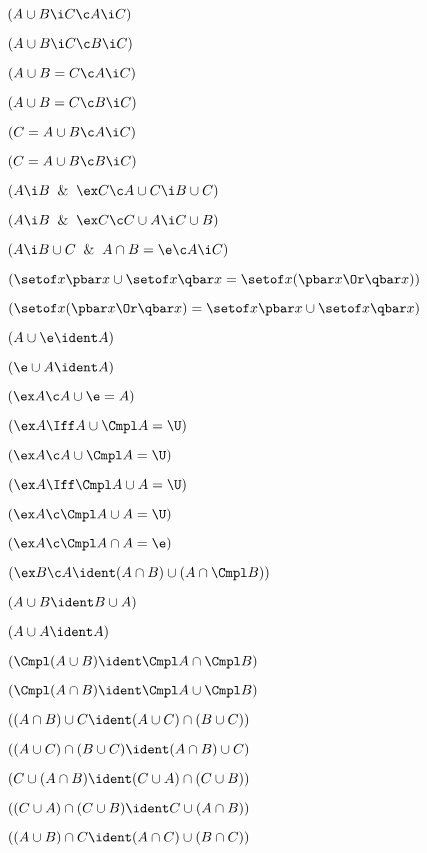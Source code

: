  $(A \cup B \i C \c A \i C)$

 $(A \cup B \i C \c B \i C)$

 $(A \cup B = C \c A \i C)$

 $(A \cup B = C \c B \i C)$

 $(C = A \cup B \c A \i C)$

 $(C = A \cup B \c B \i C)$

 $(A\i B \And \ex C\c A\cup C \i B\cup C)$

 $(A\i B \And \ex C\c C \cup A \i C \cup  B)$

 $(A\i B \cup C \And A \cap B = \e \c A \i C)$

 $(\setof x \pbar x \cup \setof x \qbar x = \setof x (\pbar x\Or \qbar x))$

 $( \setof x (\pbar x\Or\qbar x) = \setof x \pbar x \cup \setof x \qbar x)$

 $(A \cup \e \ident A)$

 $(\e \cup A \ident A)$

 $(\ex A \c A\cup \e = A)$

 $(\ex A \Iff A \cup \Cmpl A = \U)$

 $(\ex A \c A \cup \Cmpl A = \U)$

 $(\ex A \Iff \Cmpl A \cup A = \U)$

 $(\ex A \c \Cmpl A \cup  A = \U)$

 $(\ex A \c \Cmpl A \cap  A = \e)$

 $(\ex B \c A \ident(A\cap B)\cup(A \cap \Cmpl B))$

 $(A \cup B \ident B \cup A)$

 $(A \cup A \ident A)$

 $(\Cmpl(A \cup B) \ident \Cmpl A \cap \Cmpl B)$

 $(\Cmpl(A \cap B) \ident \Cmpl A \cup \Cmpl B)$

 $((A \cap B) \cup C \ident (A \cup C)\cap(B\cup C))$

 $((A \cup C)\cap(B\cup C)\ident(A \cap B)\cup C)$

 $(C \cup (A \cap B)\ident (C\cup A)\cap(C\cup B))$

 $((C \cup A )\cap(C\cup B)\ident C\cup(A \cap B))$

 $((A \cup B) \cap C \ident (A \cap C)\cup(B\cap C))$

